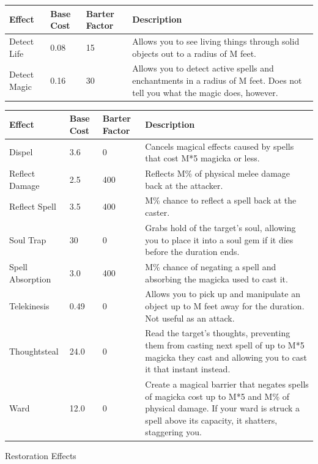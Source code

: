 \documentclass[12pt]{book}
\begin{document}
\begin{tabular}{p{}|p{}|p{}|p{}}
Effect & Base Cost & Barter Factor & Description\\ \hline
Detect Life & 0.08 & 15 & Allows you to see living things through solid objects out to a radius of M feet.\\ \hline
Detect Magic & 0.16 & 30 & Allows you to detect active spells and enchantments in a radius of M feet. Does not tell you what the magic does, however.\\
\end{tabular}

\begin{tabular}{p{}|p{}|p{}|p{}}
Effect & Base Cost & Barter Factor & Description\\ \hline
Dispel & 3.6 & 0 & Cancels magical effects caused by spells that cost M*5 magicka or less.\\ \hline
Reflect Damage & 2.5 & 400 & Reflects M\% of physical melee damage back at the attacker.\\ \hline
Reflect Spell & 3.5 & 400 & M\% chance to reflect a spell back at the caster.\\ \hline
Soul Trap & 30 & 0 & Grabs hold of the target's soul, allowing you to place it into a soul gem if it dies before the duration ends.\\ \hline
Spell Absorption & 3.0 & 400 & M\% chance of negating a spell and absorbing the magicka used to cast it.\\ \hline
Telekinesis & 0.49 & 0 & Allows you to pick up and manipulate an object up to M feet away for the duration. Not useful as an attack.\\ \hline
Thoughtsteal & 24.0 & 0 & Read the target's thoughts, preventing them from casting next spell of up to M*5 magicka they cast and allowing you to cast it that instant instead.\\ \hline
Ward & 12.0 & 0 & Create a magical barrier that negates spells of magicka cost up to M*5 and M\% of physical damage. If your ward is struck a spell above its capacity, it shatters, staggering you.\\
\end{tabular}

Restoration Effects
\end{document}

